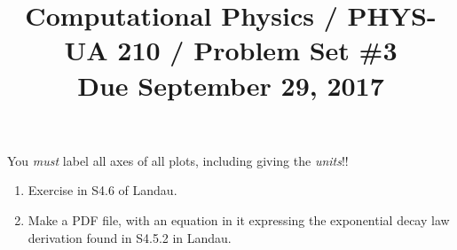 \documentclass[11pt, preprint]{aastex}
\begin{document}
\title{\bf Computational Physics / PHYS-UA 210 / Problem Set \#3
\\ Due September 29, 2017 }

You {\it must} label all axes of all plots, including giving the {\it
  units}!!

\begin{enumerate}

  \item Exercise in S4.6 of Landau.

  \item Make a PDF file, with an equation in it expressing the
    exponential decay law derivation found in S4.5.2 in Landau.

\end{enumerate}
\end{document}
